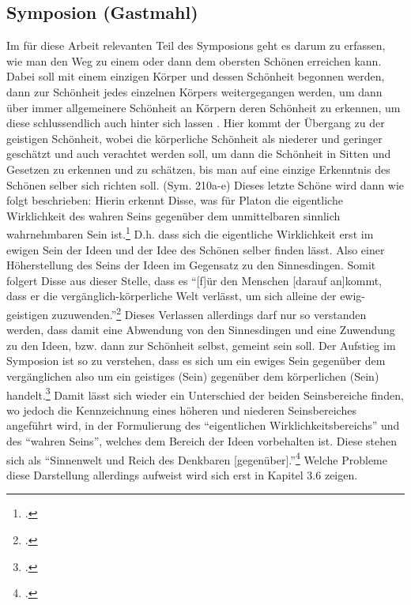\subsection{Symposion (Gastmahl)}
Im für diese Arbeit relevanten Teil des Symposions geht es darum zu erfassen, wie man den Weg zu einem oder dann dem obersten Schönen erreichen kann. Dabei soll mit einem einzigen Körper und dessen Schönheit begonnen werden, dann zur Schönheit jedes einzelnen Körpers weitergegangen werden, um dann über immer allgemeinere Schönheit an Körpern deren Schönheit zu erkennen, um diese schlussendlich auch hinter sich lassen . Hier kommt der Übergang zu der geistigen Schönheit, wobei die körperliche Schönheit als niederer und geringer geschätzt und auch verachtet werden soll, um dann die Schönheit in Sitten und Gesetzen zu erkennen und zu schätzen, bis man auf eine einzige Erkenntnis des Schönen selber sich richten soll. (Sym. 210a-e)  
Dieses letzte Schöne wird dann wie folgt beschrieben: 
Hierin erkennt Disse, was für Platon die eigentliche Wirklichkeit des wahren Seins gegenüber dem unmittelbaren sinnlich wahrnehmbaren Sein ist.\footcite[vgl.][S. 27]{DisseMetaphysik} D.h. dass sich die eigentliche Wirklichkeit erst im ewigen Sein der Ideen und der Idee des Schönen selber finden lässt. Also einer Höherstellung des Seins der Ideen im Gegensatz zu den Sinnesdingen. Somit folgert Disse aus dieser Stelle, dass es \enquote{[f]ür den Menschen [darauf an]kommt, dass er die vergänglich-körperliche Welt verlässt, um sich alleine der ewig-geistigen zuzuwenden.}\footcite[vgl.][S. 28]{DisseMetaphysik} Dieses Verlassen allerdings darf nur so verstanden werden, dass damit eine Abwendung von den Sinnesdingen und eine Zuwendung zu den Ideen, bzw. dann zur Schönheit selbst, gemeint sein soll. 
Der Aufstieg im Symposion ist so zu verstehen, dass es sich um ein ewiges Sein gegenüber dem vergänglichen also um ein geistiges (Sein) gegenüber dem körperlichen (Sein) handelt.\footcite[vgl.][S. 27f.]{DisseMetaphysik}
Damit lässt sich wieder ein Unterschied der beiden Seinsbereiche finden, wo jedoch die Kennzeichnung eines höheren und niederen Seinsbereiches angeführt wird, in der Formulierung des \enquote{eigentlichen Wirklichkeitsbereichs} und des \enquote{wahren Seins}, welches dem Bereich der Ideen vorbehalten ist. Diese stehen sich als \enquote{Sinnenwelt und Reich des Denkbaren [gegenüber].}\footcite[vgl.][S. 28]{DisseMetaphysik} Welche Probleme diese Darstellung allerdings aufweist wird sich erst in Kapitel 3.6 zeigen.
